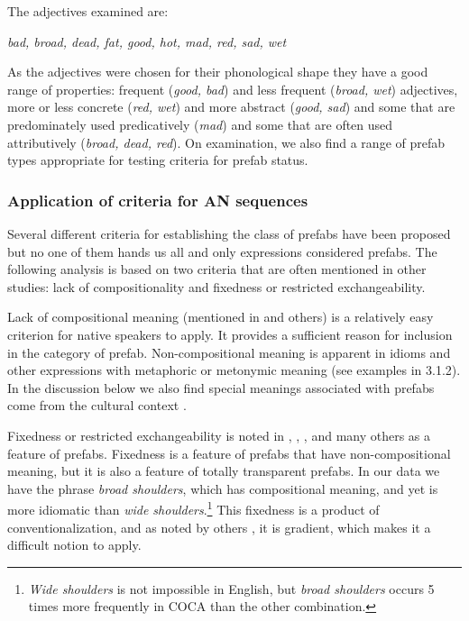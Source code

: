 \documentclass[output=paper]{langscibook}
\begin{document}
The adjectives examined are:

\ea\label{ex:bybee:2}
\textit{bad, broad, dead, fat, good, hot, mad, red, sad, wet}
\z

As the adjectives were chosen for their phonological shape they have a good range of properties: frequent (\textit{good, bad}) and less frequent (\textit{broad, wet}) adjectives, more or less concrete (\textit{red, wet}) and more abstract (\textit{good, sad}) and some that are predominately used predicatively (\textit{mad}) and some that are often used attributively (\textit{broad, dead, red}). On examination, we also find a range of prefab types appropriate for testing criteria for prefab status.

\subsubsection{Application of criteria for AN sequences}\label{sec:bybee:3.1.1}


Several different criteria for establishing the class of prefabs have been proposed but no one of them hands us all and only expressions considered prefabs. The following analysis is based on two criteria that are often mentioned in other studies: lack of compositionality and fixedness or restricted exchangeability. 

 Lack of compositional meaning (mentioned in \citealt{ErmanWarren2000,Wray2002,CorriganEtAl2009} and others) is a relatively easy criterion for native speakers to apply. It provides a sufficient reason for inclusion in the category of prefab. Non-compositional meaning is apparent in idioms and other expressions with metaphoric or metonymic meaning (see examples in 3.1.2). In the discussion below we also find special meanings associated with prefabs come from the cultural context \citep{Hoffman2004}. 

Fixedness or restricted exchangeability is noted in \citet{Sinclair1991}, \citet{ErmanWarren2000}, \citet{Wray2002}, \citet{CorriganEtAl2009} and many others as a feature of prefabs. Fixedness is a feature of prefabs that have non-compositional meaning, but it is also a feature of totally transparent prefabs. In our data we have the phrase \textit{broad shoulders}, which has compositional meaning, and yet is more idiomatic than \textit{wide shoulders}.\footnote{\textit{Wide shoulders} is not impossible in English, but \textit{broad shoulders} occurs 5 times more frequently in COCA than the other combination.}  This fixedness is a product of conventionalization, and as noted by others \citep{Pawley1986,ErmanWarren2000,Wray2002}, it is gradient, which makes it a difficult notion to apply.
\end{document}

